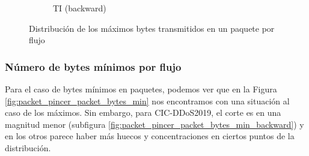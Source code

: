 \begin{figure}[H]
\begin{subfigure}[b]{0.26\textwidth}
        \caption{TI (backward)}
    \end{subfigure}
    \hfill
       \caption{Distribución de los máximos bytes transmitidos en un paquete por flujo}
       \label{fig:packet_pincer_packet_bytes_max}
\end{figure}

\subsubsection{Número de bytes mínimos por flujo}

Para el caso de bytes mínimos en paquetes, podemos ver que en la Figura \ref{fig:packet_pincer_packet_bytes_min} nos encontramos con una situación al caso de los máximos. Sin embargo, para CIC-DDoS2019, el corte es en una magnitud menor (subfigura \ref{fig:packet_pincer_packet_bytes_min_backward}) y en los otros parece haber más huecos y concentraciones en ciertos puntos de la distribución.

